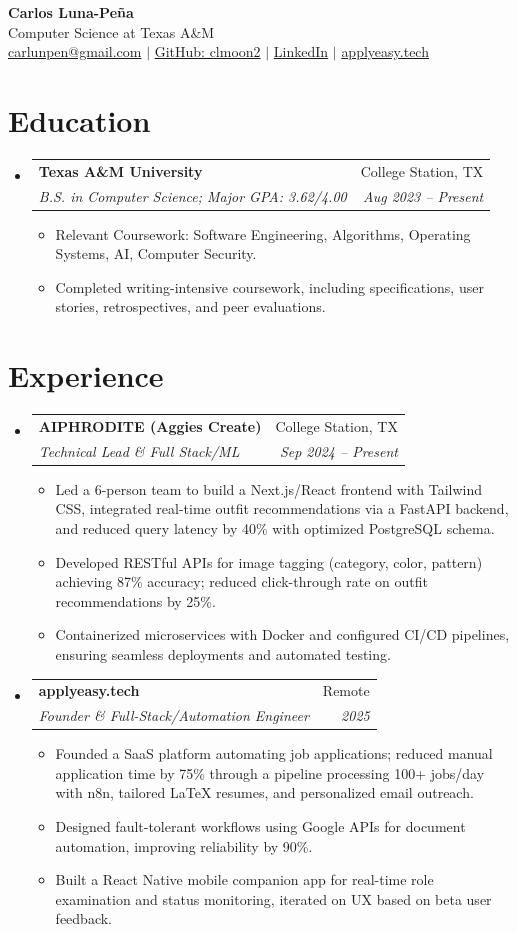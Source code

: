 \documentclass[letterpaper,11pt]{article}
\makeatletter
\newcommand{\resumeItem}[1]{
  \item\small{{#1 \vspace{-2pt}}}
}
\newcommand{\resumeSubheading}[4]{
  \vspace{-2pt}\item
    \begin{tabular*}{0.97\textwidth}[t]{l@{\extracolsep{\fill}}r}
      \textbf{#1} & #2 \\
      \textit{\small#3} & \textit{\small #4} \\
    \end{tabular*}\vspace{-7pt}
}
\newcommand{\resumeSubHeadingListStart}{\begin{itemize}[leftmargin=0.15in, label={}]}
\newcommand{\resumeSubHeadingListEnd}{\end{itemize}}
\newcommand{\resumeItemListStart}{\begin{itemize}}
\newcommand{\resumeItemListEnd}{\end{itemize}\vspace{-5pt}}
\makeatother
\begin{document}
\begin{center}
\textbf{\LARGE Carlos Luna-Peña} \\
\vspace{1pt}
\small{Computer Science at Texas A\&M} \\
\vspace{1pt}
\href{mailto:carlunpen@gmail.com}{carlunpen@gmail.com} $\vert$ 
\href{https://github.com/clmoon2}{GitHub: clmoon2} $\vert$ 
\href{https://linkedin.com/in/carlos-luna}{LinkedIn} $\vert$ 
\href{https://applyeasy.tech}{applyeasy.tech}
\end{center}

\section{Education}
\resumeSubHeadingListStart
\resumeSubheading
{Texas A\&M University}{College Station, TX}
{B.S. in Computer Science; Major GPA: 3.62/4.00}{Aug 2023 -- Present}
\resumeItemListStart
\resumeItem{Relevant Coursework: Software Engineering, Algorithms, Operating Systems, AI, Computer Security.}
\resumeItem{Completed writing-intensive coursework, including specifications, user stories, retrospectives, and peer evaluations.}
\resumeItemListEnd
\resumeSubHeadingListEnd

\section{Experience}
\resumeSubHeadingListStart
\resumeSubheading
{AIPHRODITE (Aggies Create)}{College Station, TX}
{Technical Lead \& Full Stack/ML}{Sep 2024 -- Present}
\resumeItemListStart
\resumeItem{Led a 6-person team to build a Next.js/React frontend with Tailwind CSS, integrated real-time outfit recommendations via a FastAPI backend, and reduced query latency by 40\% with optimized PostgreSQL schema.}
\resumeItem{Developed RESTful APIs for image tagging (category, color, pattern) achieving 87\% accuracy; reduced click-through rate on outfit recommendations by 25\%.}
\resumeItem{Containerized microservices with Docker and configured CI/CD pipelines, ensuring seamless deployments and automated testing.}
\resumeItemListEnd

\resumeSubheading
{applyeasy.tech}{Remote}
{Founder \& Full-Stack/Automation Engineer}{2025}
\resumeItemListStart
\resumeItem{Founded a SaaS platform automating job applications; reduced manual application time by 75\% through a pipeline processing 100+ jobs/day with n8n, tailored LaTeX resumes, and personalized email outreach.}
\resumeItem{Designed fault-tolerant workflows using Google APIs for document automation, improving reliability by 90\%.}
\resumeItem{Built a React Native mobile companion app for real-time role examination and status monitoring, iterated on UX based on beta user feedback.}
\resumeItemListEnd
\resumeSubHeadingListEnd
\end{document}
